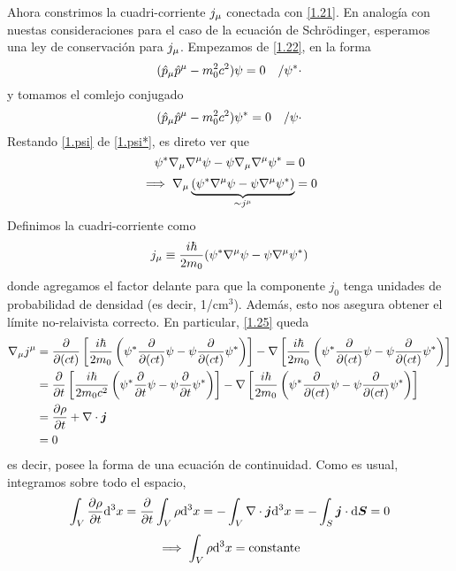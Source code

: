 Ahora constrimos la cuadri-corriente $j_\mu $ conectada con \eqref{1.21}. En analogía con nuestas consideraciones para el caso de la ecuación de Schrödinger, esperamos una ley de conservación para $j_\mu $. Empezamos de \eqref{1.22}, en la forma
\begin{equation}\label{1.psi*}
  (\hat{p}_\mu  \hat{p}^\mu -m_0^2c^2)\psi=0\quad /\psi^* \cdot
\end{equation}
y tomamos el comlejo conjugado
\begin{equation}\label{1.psi}
  (\hat{p}_\mu  \hat{p}^\mu -m_0^2c^2)\psi^*=0\quad /\psi\cdot
\end{equation}
Restando \eqref{1.psi} de \eqref{1.psi*}, es direto ver que
\begin{equation}
  \psi^*\nabla_\mu \nabla^\mu \psi-\psi\nabla_\mu \nabla^\mu \psi^*=0
\end{equation}\label{1.25}
\begin{equation}
  \implies \nabla_\mu \underbrace{(\psi^*\nabla^\mu \psi-\psi\nabla^\mu \psi^*)}_{\sim j^\mu }=0
\end{equation}
Definimos la cuadri-corriente como
\begin{equation}\label{1.26}
  j_\mu \equiv\frac{i\hbar}{2m_0}(\psi^*\nabla^\mu \psi-\psi\nabla^\mu \psi^*)
\end{equation}
donde agregamos el factor delante para que la componente $j_0$ tenga unidades de probabilidad de densidad (es decir, 1/cm$^3$). Además, esto nos asegura obtener el límite no-relaivista correcto. En particular, \eqref{1.25} queda
\begin{align*}
  \nabla_\mu j^\mu &=\pdv{(ct)}\left[\frac{i\hbar}{2m_0}\left(\psi^*\pdv{(ct)}\psi-\psi\pdv{(ct)}\psi^*\right)\right]-\nabla\left[\frac{i\hbar}{2m_0}\left(\psi^*\pdv{(ct)}\psi-\psi\pdv{(ct)}\psi^*\right)\right]\\
  &=\pdv{t}\left[\frac{i\hbar}{2m_0c^2}\left(\psi^*\pdv{t}\psi-\psi\pdv{t}\psi^*\right)\right]-\nabla\left[\frac{i\hbar}{2m_0}\left(\psi^*\pdv{(ct)}\psi-\psi\pdv{(ct)}\psi^*\right)\right]\\
  &=\pdv{\rho}{t}+\nabla\cdot\vb*{j}\\
  &=0
\end{align*}
es decir, posee la forma de una ecuación de continuidad. Como es usual, integramos sobre todo el espacio,
\begin{equation}
  \int_V\pdv{\rho}{t}\dd^3x=\pdv{t}\int_V\rho\dd^3x=-\int_V\nabla\cdot\vb*{j}\dd^3x=-\int_{S}\vb*{j}\cdot \dd \vb*{S}=0
\end{equation}
\begin{equation}
  \implies \int_V\rho\dd^3x=\rm constante
\end{equation}\label{1.29}
